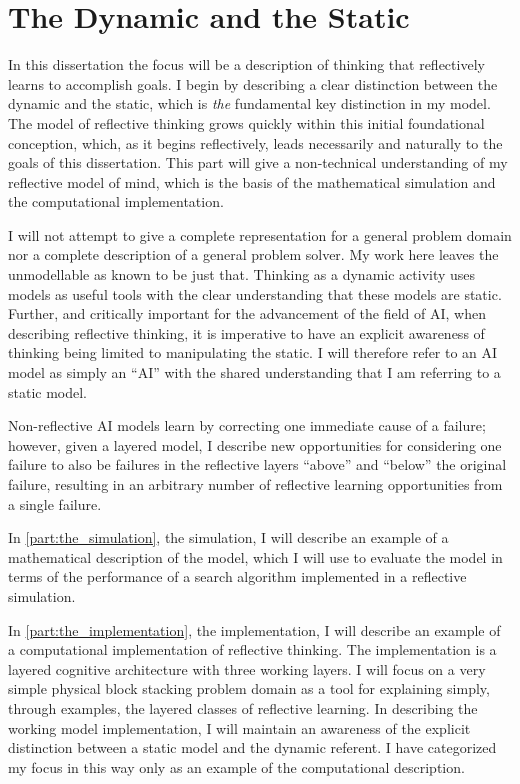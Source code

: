 \chapter{The Dynamic and the Static}
\label{chapter:the_dynamic_and_the_static}

In this dissertation the focus will be a description of thinking that
reflectively learns to accomplish goals.  I begin by describing a
clear distinction between the dynamic and the static, which is
\emph{the} fundamental key distinction in my model.  The model of
reflective thinking grows quickly within this initial foundational
conception, which, as it begins reflectively, leads necessarily and
naturally to the goals of this dissertation.  This part will give a
non-technical understanding of my reflective model of mind, which is
the basis of the mathematical simulation and the computational
implementation.

I will not attempt to give a complete representation for a general
problem domain nor a complete description of a general problem solver.
My work here leaves the unmodellable as known to be just that.
Thinking as a dynamic activity uses models as useful tools with the
clear understanding that these models are static.  Further, and
critically important for the advancement of the field of AI, when
describing reflective thinking, it is imperative to have an explicit
awareness of thinking being limited to manipulating the static.  I
will therefore refer to an AI model as simply an ``AI'' with the
shared understanding that I am referring to a static model.

Non-reflective AI models learn by correcting one immediate cause of a
failure; however, given a layered model, I describe new opportunities
for considering one failure to also be failures in the reflective
layers ``above'' and ``below'' the original failure, resulting in an
arbitrary number of reflective learning opportunities from a single
failure.

In \autoref{part:the_simulation}, the simulation, I will describe an
example of a mathematical description of the model, which I will use
to evaluate the model in terms of the performance of a search
algorithm implemented in a reflective simulation.

In \autoref{part:the_implementation}, the implementation, I will
describe an example of a computational implementation of reflective
thinking.  The implementation is a layered cognitive architecture with
three working layers.  I will focus on a very simple physical block
stacking problem domain as a tool for explaining simply, through
examples, the layered classes of reflective learning.  In describing
the working model implementation, I will maintain an awareness of the
explicit distinction between a static model and the dynamic referent.
I have categorized my focus in this way only as an example of the
computational description.

